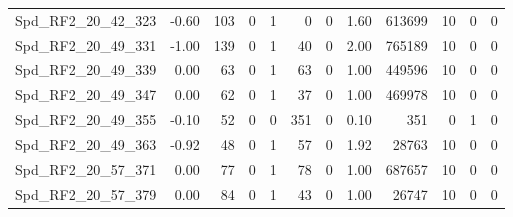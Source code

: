 \begin{longtable}[c]{@{}lrrrrrrrrrrr@{}}
Spd\_RF2\_20\_42\_323        & -0.60                  & 103                     & 0                       & 1                      & 0                       & 0                       & 1.60                    & 613699                   & 10                       & 0                        & 0                        \\
Spd\_RF2\_20\_49\_331        & -1.00                  & 139                     & 0                       & 1                      & 40                      & 0                       & 2.00                    & 765189                   & 10                       & 0                        & 0                        \\
Spd\_RF2\_20\_49\_339        & 0.00                   & 63                      & 0                       & 1                      & 63                      & 0                       & 1.00                    & 449596                   & 10                       & 0                        & 0                        \\
Spd\_RF2\_20\_49\_347        & 0.00                   & 62                      & 0                       & 1                      & 37                      & 0                       & 1.00                    & 469978                   & 10                       & 0                        & 0                        \\
Spd\_RF2\_20\_49\_355        & -0.10                  & 52                      & 0                       & 0                      & 351                     & 0                       & 0.10                    & 351                      & 0                        & 1                        & 0                        \\
Spd\_RF2\_20\_49\_363        & -0.92                  & 48                      & 0                       & 1                      & 57                      & 0                       & 1.92                    & 28763                    & 10                       & 0                        & 0                        \\
Spd\_RF2\_20\_57\_371        & 0.00                   & 77                      & 0                       & 1                      & 78                      & 0                       & 1.00                    & 687657                   & 10                       & 0                        & 0                        \\
Spd\_RF2\_20\_57\_379        & 0.00                   & 84                      & 0                       & 1                      & 43                      & 0                       & 1.00                    & 26747                    & 10                       & 0                        & 0                        \\

\end{longtable}
